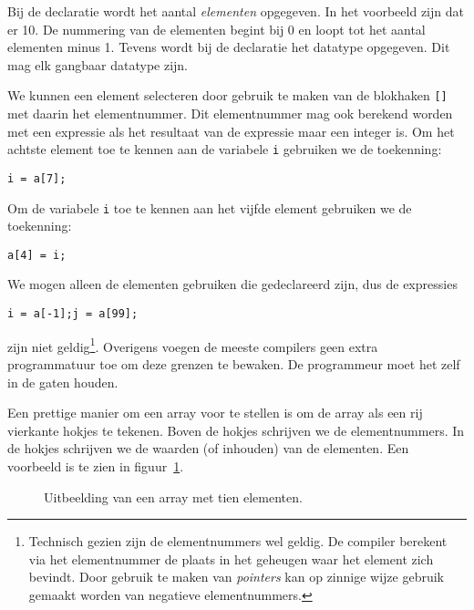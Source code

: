 Bij de declaratie wordt het aantal \textsl{elementen} opgegeven. In het voorbeeld zijn dat er 10. De nummering van de elementen begint bij 0 en loopt tot het aantal elementen minus 1. Tevens wordt bij de declaratie het datatype opgegeven. Dit mag elk gangbaar datatype zijn.

We kunnen een element selecteren door gebruik te maken van de blokhaken \texttt{[]} met daarin het elementnummer. Dit elementnummer mag ook berekend worden met een expressie als het resultaat van de expressie maar een integer is. Om het achtste element toe te kennen aan de variabele \texttt{i} gebruiken we de toekenning:

\hspace*{1em}\texttt{i = a[7];}

Om de variabele \texttt{i} toe te kennen aan het vijfde element gebruiken we de toekenning:

\hspace*{1em}\texttt{a[4] = i;}

We mogen alleen de elementen gebruiken die gedeclareerd zijn, dus de expressies

\hspace*{1em}\texttt{i = a[-1];}\quad\texttt{j = a[99];}

zijn niet geldig\footnote{Technisch gezien zijn de elementnummers wel geldig. De compiler berekent via het elementnummer de plaats in het geheugen waar het element zich bevindt. Door gebruik te maken van \textsl{pointers} kan op zinnige wijze gebruik gemaakt worden van negatieve elementnummers.}. Overigens voegen de meeste compilers geen extra programmatuur toe om deze grenzen te bewaken. De programmeur moet het zelf in de gaten houden.

Een prettige manier om een array voor te stellen is om de array als een rij vierkante hokjes te tekenen. Boven de hokjes schrijven we de elementnummers. In de hokjes schrijven we de waarden (of inhouden) van de elementen. Een voorbeeld is te zien in figuur~\ref{fig:arryinmem}.

\begin{figure}[!ht]
\centering
{}
\caption{Uitbeelding van een array met tien elementen.}
\label{fig:arryinmem}
\end{figure}

